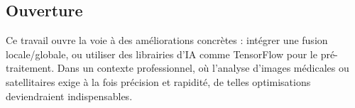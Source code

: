 \subsection{Ouverture}
Ce travail ouvre la voie à des améliorations concrètes : intégrer une fusion locale/globale, ou utiliser des librairies d'IA comme TensorFlow pour le pré-traitement. Dans un contexte professionnel, où l'analyse d'images médicales ou satellitaires exige à la fois précision et rapidité, de telles optimisations deviendraient indispensables.